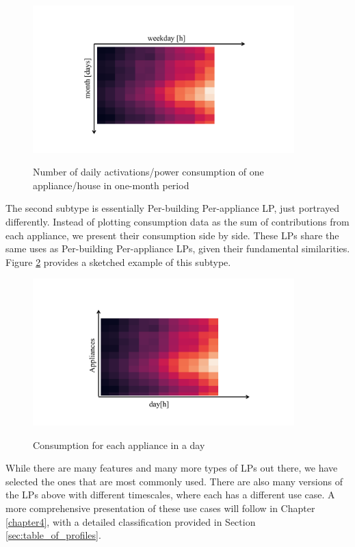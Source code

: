 \begin{figure}[H]
	\centering
	\caption{Number of daily activations/power consumption of one appliance/house in one-month period}
	\includegraphics[width=0.9\textwidth]{Figures/profile_sketches/slide10.pdf}
	\label{fig:heatmap_2dtime}
\end{figure}

The second subtype is essentially Per-building Per-appliance LP, just portrayed differently.
Instead of plotting consumption data as the sum of contributions from each appliance, we present their consumption side by side.
These LPs share the same uses as Per-building Per-appliance LPs, given their fundamental similarities.
Figure \ref{fig:heatmap_all_appl} provides a sketched example of this subtype.

\begin{figure}[H]
	\centering
	\caption{Consumption for each appliance in a day}
	\includegraphics[width=0.9\textwidth]{Figures/profile_sketches/slide12.pdf}
	\label{fig:heatmap_all_appl}
\end{figure}

While there are many features and many more types of LPs out there, we have selected the ones that are most commonly used.
There are also many versions of the LPs above with different timescales, where each has a different use case.
A more comprehensive presentation of these use cases will follow in Chapter \ref{chapter4}, with a detailed classification provided in Section \ref{sec:table_of_profiles}.


